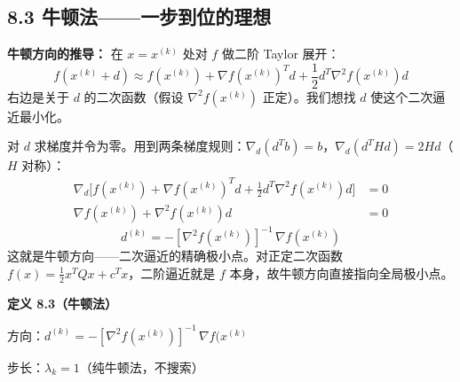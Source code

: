 \subsection{8.3 牛顿法——一步到位的理想}


\textbf{牛顿方向的推导：} 在 $x=x^{(k)}$ 处对 $f$ 做二阶 Taylor 展开：
\[
f(x^{(k)}+d) \approx f(x^{(k)}) + \nabla f(x^{(k)})^T d + \frac{1}{2} d^T \nabla^2 f(x^{(k)}) d
\]
右边是关于 $d$ 的二次函数（假设 $\nabla^2 f(x^{(k)})$ 正定）。我们想找 $d$ 使这个二次逼近最小化。

对 $d$ 求梯度并令为零。用到两条梯度规则：$\nabla_d(d^T b)=b$，$\nabla_d(d^T H d)=2Hd$（$H$ 对称）：
\begin{align*}
\nabla_d\bigl[f(x^{(k)}) + \nabla f(x^{(k)})^T d + \tfrac12 d^T \nabla^2 f(x^{(k)}) d\bigr]
&= 0 \\
\nabla f(x^{(k)}) + \nabla^2 f(x^{(k)}) d &= 0
\end{align*}
\[
\boxed{d^{(k)} = -[\nabla^2 f(x^{(k)})]^{-1}\, \nabla f(x^{(k)})}
\]
这就是牛顿方向——二次逼近的精确极小点。对正定二次函数 $f(x)=\frac12 x^T Q x + c^T x$，二阶逼近就是 $f$ 本身，故牛顿方向直接指向全局极小点。

\begin{defbox}
\textbf{定义 8.3（牛顿法）}

方向：$d^{(k)} = -[\nabla^2 f(x^{(k)})]^{-1}\, \nabla f(x^{(k)}$

步长：$\lambda_k = 1$（纯牛顿法，不搜索）
\end{defbox}


